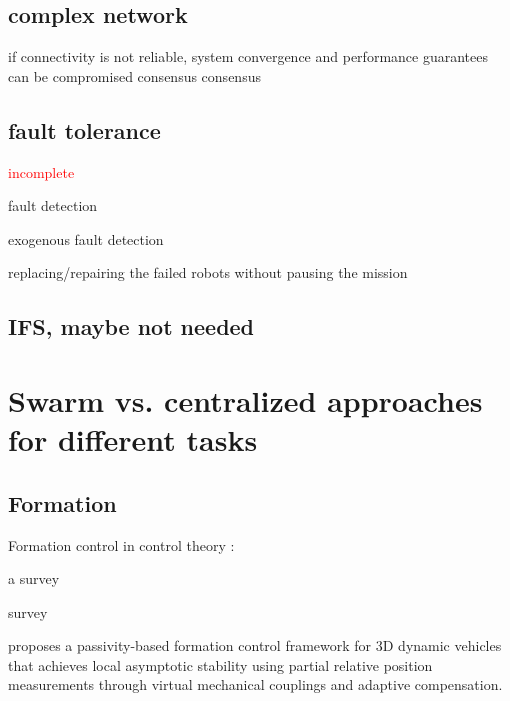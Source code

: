 \subsection{complex network}
\cite{kirst2016dynamic}
\cite{zavlanos2011graph}

if connectivity is not reliable, system convergence and performance guarantees can be compromised
\cite{cortes2008distributed} consensus
\cite{de2006decentralized}
\cite{moreau2005stability}
\cite{olfati2007consensus} consensus

\subsection{fault tolerance}
\cite{bjerknes2013fault}
\cite{tarapore2017generic}
\cite{winfield2006safety}
\cite{strobel2018managing} \textcolor{red}{incomplete}
\cite{pini2011task}
\cite{o2023predictive}
\cite{oladiran2019fault}

fault detection
\cite{tarapore2019fault}
\cite{khaldi2017monitoring}

exogenous fault detection
\cite{khadidos2015exogenous}
\cite{millard2016exogenous}
\cite{millard2013towards}

replacing/repairing the failed robots without pausing the mission
\cite{christensen2009fireflies}
\cite{varadharajan2020swarm}

\subsection{IFS, maybe not needed}
\cite{edition2000authoritative}
\cite{zhou2019review}
\cite{niu2021distributed}
\cite{sheng2021intermittent}
\cite{zhang2021intermittent}
\cite{syed2016novel}


\section{Swarm vs. centralized approaches for different tasks}

\subsection{Formation}

Formation control in control theory :

\cite{liu2018survey} a survey

\cite{oh2015survey} survey

\cite{stacey2015passivity} proposes a passivity-based formation control framework for 3D dynamic vehicles that achieves local asymptotic stability using partial relative position measurements through virtual mechanical couplings and adaptive compensation.

